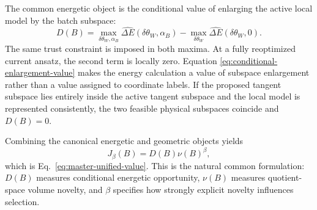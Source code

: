 \documentclass[10pt,twocolumn]{article}
\newcommand{\conceptbreak}{\par\medskip\noindent{\color{black!30}\rule{\columnwidth}{0.35pt}}\par\medskip}
\begin{document}
The common energetic object is the conditional value of enlarging the active
local model by the batch subspace:
\begin{equation}
\boxed{
D(B)
=\max_{\delta\theta_W,\alpha_B}\widehat{\Delta E}
(\delta\theta_W,\alpha_B)
-\max_{\delta\theta_W}\widehat{\Delta E}
(\delta\theta_W,0).}
\label{eq:conditional-enlargement-value}
\end{equation}
The same trust constraint is imposed in both maxima. At a fully reoptimized
current ansatz, the second term is locally zero. Equation
\eqref{eq:conditional-enlargement-value} makes the energy calculation a value
of subspace enlargement rather than a value assigned to coordinate labels. If
the proposed tangent subspace lies entirely inside the active tangent subspace
and the local model is represented consistently, the two feasible physical
subspaces coincide and \(D(B)=0\).

Combining the canonical energetic and geometric objects yields
\[
J_\beta(B)=D(B)\nu(B)^\beta,
\]
which is Eq.~\eqref{eq:master-unified-value}. This is the natural common
formulation: \(D(B)\) measures conditional energetic opportunity,
\(\nu(B)\) measures quotient-space volume novelty, and \(\beta\) specifies how
strongly explicit novelty influences selection.

\conceptbreak
\end{document}
